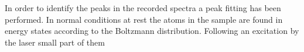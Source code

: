 
In order to identify the peaks in the recorded spectra a peak fitting has been performed. In normal conditions at rest the atoms in the sample are found in energy states according to the Boltzmann distribution. Following an excitation by the laser small part of them 